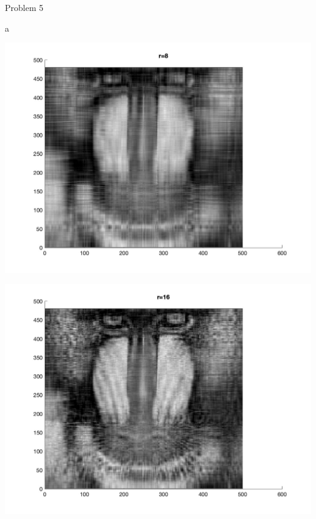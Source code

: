 \begin{section}{Problem 5}
\begin{solution}{a}
        \continued

        \begin{mdframed}
            \includegraphics[scale=0.33]{DevamSisodraker_5a_8.jpg}
        \end{mdframed}

        \continued

        \begin{mdframed}
            \includegraphics[scale=0.33]{DevamSisodraker_5a_16.jpg}
        \end{mdframed}

        \continued


\end{solution}
\end{section}
